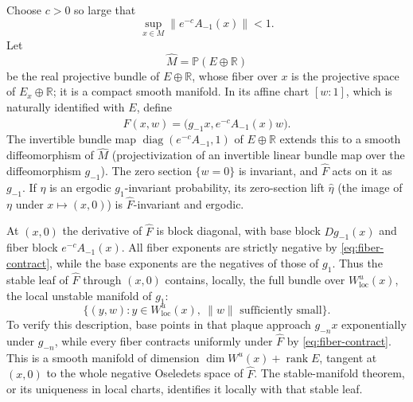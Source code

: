\documentclass[12pt]{article}
\theoremstyle{remark}
\newcommand{\R}{\mathbb R}
\begin{document}
Choose \(c>0\) so large that
\begin{equation}\label{eq:fiber-contract}
 \sup_{x\in M}\|e^{-c}A_{-1}(x)\|<1.
\end{equation}
Let
\[
 \widehat M=\mathbb P(E\oplus\R)
\]
be the real projective bundle of \(E\oplus\R\), whose fiber over
\(x\) is the projective space of \(E_x\oplus\R\); it is a compact
smooth manifold.
In its affine chart \([w:1]\), which is naturally identified with \(E\),
define
\begin{equation}\label{eq:lift}
 \widehat F(x,w)=\bigl(g_{-1}x,e^{-c}A_{-1}(x)w\bigr).
\end{equation}
The invertible bundle map \(\operatorname{diag}(e^{-c}A_{-1},1)\)
of \(E\oplus\R\) extends this to a smooth diffeomorphism of
\(\widehat M\) (projectivization of an invertible linear bundle map
over the diffeomorphism \(g_{-1}\)).
The zero section \(\{w=0\}\) is invariant, and \(\widehat F\) acts
on it as \(g_{-1}\).
If \(\eta\) is an ergodic \(g_1\)-invariant probability, its
zero-section lift \(\widehat\eta\) (the image of \(\eta\) under
\(x\mapsto(x,0)\)) is \(\widehat F\)-invariant and ergodic.

At \((x,0)\) the derivative of \(\widehat F\) is block diagonal, with
base block \(Dg_{-1}(x)\) and fiber block \(e^{-c}A_{-1}(x)\).
All fiber exponents are strictly negative by
\eqref{eq:fiber-contract}, while the base exponents are the negatives
of those of \(g_1\).  Thus the stable leaf of \(\widehat F\) through
\((x,0)\) contains, locally, the full bundle over
\(W^u_{\mathrm{loc}}(x)\), the local unstable manifold of \(g_1\):
\begin{equation}\label{eq:lifted-leaf}
 \{(y,w):y\in W^u_{\mathrm{loc}}(x),\ \|w\|\text{ sufficiently small}\}.
\end{equation}
To verify this description, base points in that plaque approach
\(g_{-n}x\) exponentially under \(g_{-n}\), while every fiber
contracts uniformly under \(\widehat F\) by \eqref{eq:fiber-contract}.
This is a smooth manifold of dimension
\(\dim W^u(x)+\operatorname{rank}E\), tangent at \((x,0)\) to the whole
negative Oseledets space of \(\widehat F\).
The stable-manifold theorem, or its uniqueness in local charts,
identifies it locally with that stable leaf.
\end{document}
